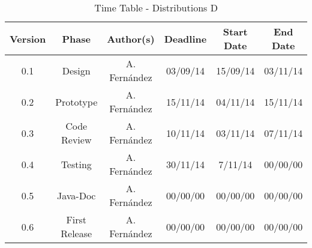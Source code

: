 \begin{table}
\caption{Time Table - Distributions D}
\begin{tabular}{cccccc}
\hline
\textbf{Version} & \textbf{Phase} & \textbf{Author(s)} & \textbf{Deadline} & \textbf{Start Date} & \textbf{End Date}\\
\hline
0.1 & Design & A. Fern\'andez & 03/09/14 & 15/09/14 & 03/11/14\\
\hline 
0.2 & Prototype & A. Fern\'andez & 15/11/14 & 04/11/14 & 15/11/14\\
\hline 
0.3 & Code Review & A. Fern\'andez & 10/11/14 & 03/11/14 & 07/11/14\\
\hline 
0.4 & Testing & A. Fern\'andez & 30/11/14 & 7/11/14 & 00/00/00\\
\hline 
0.5 & Java-Doc  & A. Fern\'andez & 00/00/00 & 00/00/00 & 00/00/00\\
\hline 
0.6 & First Release & A. Fern\'andez & 00/00/00 & 00/00/00 & 00/00/00\\
\hline
\end{tabular}
\end{table}